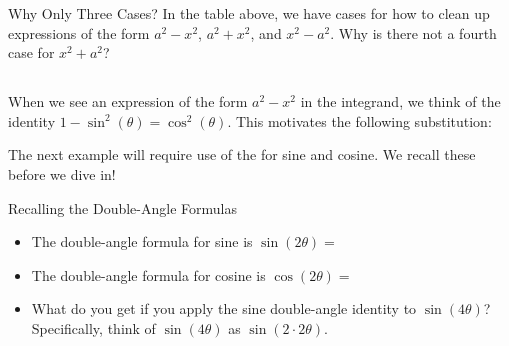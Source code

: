\begin{exercise}{Why Only Three Cases? \Coffeecup} In the table above, we have cases for how to clean up expressions of the form $a^2-x^2$, $a^2+x^2$, and $x^2-a^2$.  Why is there not a fourth case for $x^2+a^2$?
\end{exercise}%
%
\subsection{} When we see an expression of the form $a^2-x^2$ in the integrand, we think of the identity $1-\sin^2(\theta)=\cos^2(\theta)$.  This motivates the following substitution:


The next example will require use of the  for sine and cosine.  We recall these before we dive in!

\begin{exercise}{Recalling the Double-Angle Formulas \Coffeecup}
\begin{itemize}
\item The double-angle formula for sine is $\sin(2\theta)=$
\solushun{$\sin(2\theta)=2\sin(\theta)\cos(\theta)$\\}{0in}
\item The double-angle formula for cosine is $\cos(2\theta)=$
\item What do you get if you apply the sine double-angle identity to $\sin(4\theta)$?  Specifically, think of $\sin(4\theta)$ as $\sin\left(2\cdot 2\theta \right)$. 
\solushun{$\sin(4\theta)=2\sin(2\theta)\cos(2\theta)$\\}{.2in}\vspace*{.2in}
\end{itemize}
\end{exercise}


